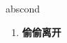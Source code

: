 
\begin{frame}
{\huge abscond}
\begin{center}
\begin{enumerate}\Large
  \item \textbf{偷偷离开}
\end{enumerate}
\end{center}
\end{frame}
